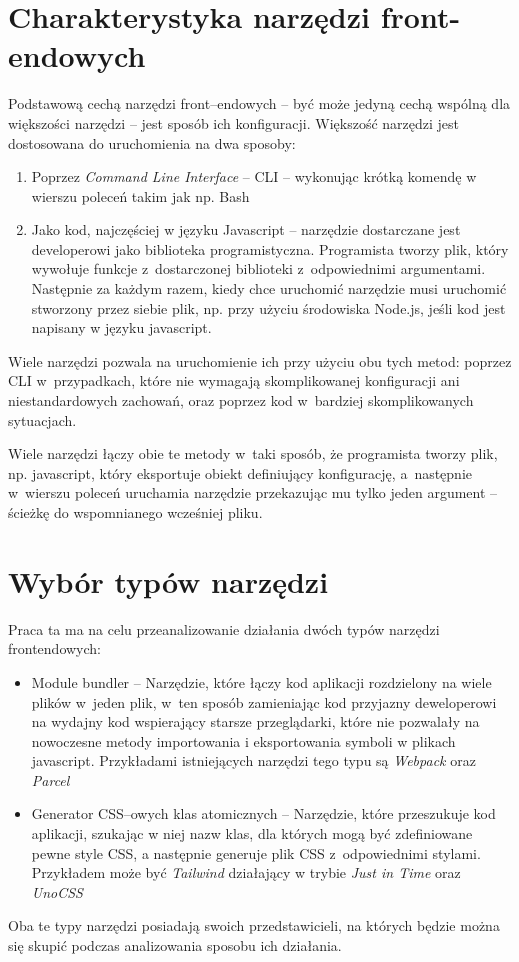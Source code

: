 \documentclass{SGGW-thesis}
\begin{document}
\section{Charakterystyka narzędzi front-endowych}
Podstawową cechą narzędzi front--endowych -- być może jedyną cechą wspólną dla większości narzędzi -- jest sposób ich konfiguracji. Większość narzędzi jest dostosowana do uruchomienia na dwa sposoby:
\begin{enumerate}
    \item Poprzez \emph{Command Line Interface} -- CLI -- wykonując krótką komendę w wierszu poleceń takim jak np. Bash
    \item Jako kod, najczęściej w języku Javascript -- narzędzie dostarczane jest developerowi jako biblioteka programistyczna. Programista tworzy plik, który wywołuje funkcje z~dostarczonej biblioteki z~odpowiednimi argumentami. Następnie za każdym razem, kiedy chce uruchomić narzędzie musi uruchomić stworzony przez siebie plik, np. przy użyciu środowiska Node.js, jeśli kod jest napisany w języku javascript.
\end{enumerate}
Wiele narzędzi pozwala na uruchomienie ich przy użyciu obu tych metod: poprzez CLI w~przypadkach, które nie wymagają skomplikowanej konfiguracji ani niestandardowych zachowań, oraz poprzez kod w~bardziej skomplikowanych sytuacjach.

Wiele narzędzi łączy obie te metody w~taki sposób, że programista tworzy plik, np. javascript, który eksportuje obiekt definiujący konfigurację, a~następnie w~wierszu poleceń uruchamia narzędzie przekazując mu tylko jeden argument -- ścieżkę do wspomnianego wcześniej pliku.

\section{Wybór typów narzędzi}
Praca ta ma na celu przeanalizowanie działania dwóch typów narzędzi frontendowych:
\begin{itemize}
    \item Module bundler -- Narzędzie, które łączy kod aplikacji rozdzielony na wiele plików w~jeden plik, w~ten sposób zamieniając kod przyjazny deweloperowi na wydajny kod wspierający starsze przeglądarki, które nie pozwalały na nowoczesne metody importowania i eksportowania symboli w plikach javascript. Przykładami istniejących narzędzi tego typu są \emph{Webpack} oraz \emph{Parcel}
    \item Generator CSS--owych klas atomicznych -- Narzędzie, które przeszukuje kod aplikacji, szukając w niej nazw klas, dla których mogą być zdefiniowane pewne style CSS, a następnie generuje plik CSS z~odpowiednimi stylami. Przykładem może być \emph{Tailwind\cite{Tailwind_jit}} działający w trybie \emph{Just in Time} oraz \emph{UnoCSS\cite{unocss}}
\end{itemize}
Oba te typy narzędzi posiadają swoich przedstawicieli, na których będzie można się skupić podczas analizowania sposobu ich działania.
\end{document}
